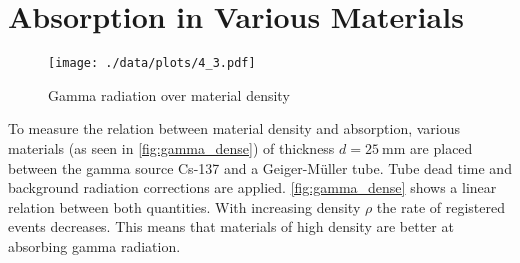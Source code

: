 \section{Absorption in Various Materials}
\begin{figure}[htb]
	\centering
	\texttt{[image: ./data/plots/4\_3.pdf]}
	\caption[Gamma radiation over material density]{Gamma radiation over material density}
	\label{fig:gamma_dense}
\end{figure}
To measure the relation between material density and absorption, various materials (as seen in \autoref{fig:gamma_dense}) of thickness $d=\SI{25}{\milli\meter}$ are placed between the gamma source Cs-137 and a Geiger-Müller tube.
Tube dead time and background radiation corrections are applied.
\autoref{fig:gamma_dense} shows a linear relation between both quantities.
With increasing density $\rho$ the rate of registered events decreases.
This means that materials of high density are better at absorbing gamma radiation.
